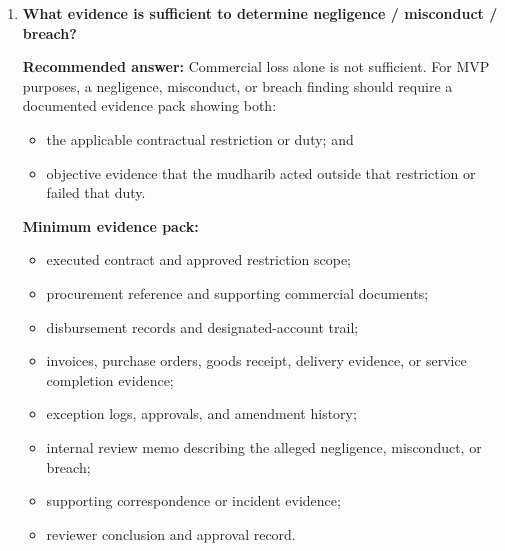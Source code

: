 \documentclass[11pt]{article}
\begin{document}
\begin{enumerate}[leftmargin=1.8em,label=\textbf{Q\arabic*.}]
    \textbf{Recommended answer:} Not necessarily before \emph{every} event, provided the product structure, profit formula, deductible-cost taxonomy, and evidence requirements have already been approved and the system performs compliance checks and records review evidence. However, manual review should be mandatory for:
    \begin{itemize}[leftmargin=1.5em]
        \item the first live distribution under a new template or rule version;
        \item any exception or override;
        \item any change to the profit formula or deductible-cost mapping;
        \item any event involving loss reallocation to the mudharib;
        \item any suspected Shariah non-compliance or dispute.
    \end{itemize}

    \item \textbf{What evidence is sufficient to determine negligence / misconduct / breach?}

    \textbf{Recommended answer:} Commercial loss alone is not sufficient. For MVP purposes, a negligence, misconduct, or breach finding should require a documented evidence pack showing both:
    \begin{itemize}[leftmargin=1.5em]
        \item the applicable contractual restriction or duty; and
        \item objective evidence that the mudharib acted outside that restriction or failed that duty.
    \end{itemize}

    \textbf{Minimum evidence pack:}
    \begin{itemize}[leftmargin=1.5em]
        \item executed contract and approved restriction scope;
        \item procurement reference and supporting commercial documents;
        \item disbursement records and designated-account trail;
        \item invoices, purchase orders, goods receipt, delivery evidence, or service completion evidence;
        \item exception logs, approvals, and amendment history;
        \item internal review memo describing the alleged negligence, misconduct, or breach;
        \item supporting correspondence or incident evidence;
        \item reviewer conclusion and approval record.
    \end{itemize}


\end{enumerate}
\end{document}
